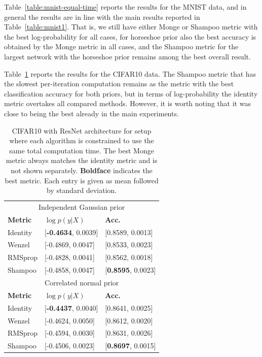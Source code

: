 \documentclass[10pt]{article} %
\theoremstyle{plain}
\theoremstyle{definition}
\theoremstyle{remark}
\begin{document}
Table~\ref{table:mnist-equal-time} reports the results for the MNIST data, and in general the results are in line with the main results reported in Table~\ref{table:mnist1}. That is, we still have either Monge or Shampoo metric with the best log-probability for all cases, for horseshoe prior also the best accuracy is obtained by the Monge metric in all cases, and the Shampoo metric for the largest network with the horseshoe prior remains among the best overall result.


Table~\ref{table:cifar10-equal-time} reports the results for the CIFAR10 data. The Shampoo metric that has the slowest per-iteration computation remains as the metric with the best classification accuracy for both priors, but in terms of log-probability the identity metric overtakes all compared methods. However, it is worth noting that it was close to being the best already in the main experiments.

\begin{table}[t]
\centering
\begin{tabular}{l|ll}

\multicolumn{3}{c}{Independent Gaussian prior} \\
{\bf Metric}                   & $\log p(y|X)$  & {\bf Acc.}  \\
\hline
Identity & 
[{\bf -0.4634}, 0.0039] & [0.8589, 0.0013] \\
Wenzel   & 
[-0.4869, 0.0047] & [0.8533, 0.0023] \\
RMSprop  &
[-0.4828, 0.0041] & [0.8562, 0.0018] \\
Shampoo  &
[-0.4858, 0.0047] & [{\bf 0.8595}, 0.0023] \\
\multicolumn{3}{c}{Correlated normal prior} \\
{\bf Metric}                   & $\log p(y|X)$  & {\bf Acc.}  \\
\hline
Identity & 
[{\bf -0.4437}, 0.0040] & [0.8641, 0.0025] \\
Wenzel   & 
[-0.4624, 0.0050] & [0.8612, 0.0020] \\
RMSprop  &
[-0.4594, 0.0030] & [0.8631, 0.0026] \\
Shampoo  &
[-0.4506, 0.0023] & [{\bf 0.8697}, 0.0015] \\
\end{tabular}
\caption{CIFAR10 with ResNet architecture for setup where each algorithm is constrained to use the same total computation time. The best Monge metric always matches the identity metric and is not shown separately. {\bf Boldface} indicates the best metric. Each entry is given as mean followed by standard deviation.}
\label{table:cifar10-equal-time}
\end{table}
\end{document}
